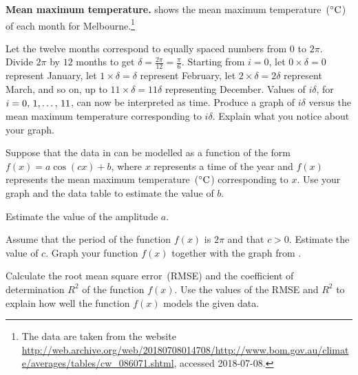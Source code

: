 \documentclass[a4paper,oneside,12pt]{article}
\begin{document}
\begin{example}
\label{eg:trigonometric:mean_maximum_temperature}
\textbf{Mean maximum temperature.}
 shows the mean
maximum temperature~(${}^{\circ}\textrm{C}$) of each month for
Melbourne.\footnote{
  The data are taken from the website
  \url{http://web.archive.org/web/20180708014708/http://www.bom.gov.au/climate/averages/tables/cw_086071.shtml},
  accessed 2018-07-08.
}
\begin{packedenum}
\item\label{subeg:trigonometric:mean_max_temperature_graph}
  Let the twelve months correspond to equally spaced numbers from $0$
  to $2\pi$.  Divide $2\pi$ by $12$ months to get
  $\delta = \frac{2\pi}{12} = \frac{\pi}{6}$.  Starting from $i = 0$,
  let $0 \times \delta = 0$ represent January, let
  $1 \times \delta = \delta$ represent February, let
  $2 \times \delta = 2\delta$ represent March, and so on, up to
  $11 \times \delta = 11\delta$ representing December.  Values of
  $i\delta$, for $i = {0},\, {1}, \dots,\, {11}$, can now be interpreted as time.
  Produce a graph of $i\delta$ versus the mean maximum temperature
  corresponding to $i\delta$.  Explain what you notice about your
  graph.

\item\label{subeg:trigonometric:mean_max_temperature_midline}
  Suppose that the data in
   can be modelled
  as a function of the form $f(x) = a \cos(cx) + b$, where $x$
  represents a time of the year and $f(x)$ represents the mean maximum
  temperature~(${}^{\circ}\textrm{C}$) corresponding to $x$.  Use your graph and
  the data table to estimate the value of $b$.

\item\label{subeg:trigonometric:mean_max_temperature_amplitude}
  Estimate the value of the amplitude $a$.

\item\label{subeg:trigonometric:mean_max_temperature_c}
  Assume that the period of the function $f(x)$ is $2\pi$ and that
  $c > 0$.  Estimate the value of $c$.  Graph your function $f(x)$
  together with the graph
  from .

\item\label{subeg:trigonometric:mean_max_temperature_RMSE_R2}
  Calculate the root mean square error~(RMSE) and the coefficient of
  determination $R^2$ of the function $f(x)$.  Use the
  values of the RMSE and $R^2$ to explain how well the function $f(x)$
  models the given data.
\end{packedenum}
\end{example}
\end{document}
